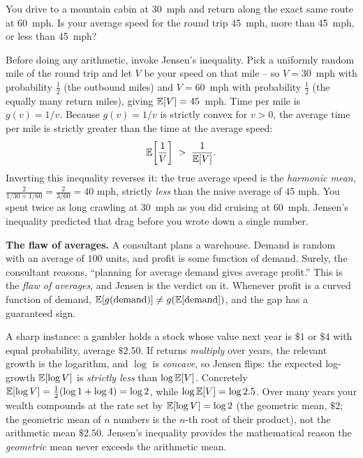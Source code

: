 \begin{walkbox}
You drive to a mountain cabin at 30~mph and return along the exact same route
at 60~mph. Is your average speed for the round trip 45~mph, more than 45~mph,
or less than 45~mph?

Before doing any arithmetic, invoke Jensen's inequality. Pick a uniformly random
mile of the round trip and let $V$ be your speed on that mile -- so $V = 30$~mph
with probability $\tfrac12$ (the outbound miles) and $V = 60$~mph with probability
$\tfrac12$ (the equally many return miles), giving $\operatorname{\mathbb{E}}[V] = 45$~mph. Time
per mile is $g(v) = 1/v$. Because $g(v) = 1/v$ is strictly convex for $v > 0$,
the average time per mile is strictly greater than the time at the average speed:
\[
  \operatorname{\mathbb{E}}\!\left[\frac{1}{V}\right] \;>\; \frac{1}{\operatorname{\mathbb{E}}[V]}.
\]
Inverting this inequality reverses it: the true average speed is the
\emph{harmonic mean},
$\frac{2}{1/30 + 1/60} = \frac{2}{3/60} = 40\text{ mph}$,
strictly \emph{less} than the naive average of $45\text{ mph}$. You spent
twice as long crawling at 30~mph as you did cruising at 60~mph. Jensen's
inequality predicted that drag before you wrote down a single number.
\end{walkbox}

\begin{paradoxbox}
\textbf{The flaw of averages.} A consultant plans a warehouse. Demand is
random with an average of $100$ units, and profit is some function of demand.
Surely, the consultant reasons, ``planning for average demand gives average
profit.'' This is the \emph{flaw of averages}, and Jensen is the verdict on
it. Whenever profit is a curved function of demand, $\operatorname{\mathbb{E}}[g(\text{demand})] \ne
g(\operatorname{\mathbb{E}}[\text{demand}])$, and the gap has a guaranteed sign.

A sharp instance: a gambler holds a stock whose value next year is $\$1$ or
$\$4$ with equal probability, average $\$2.50$. If returns \emph{multiply}
over years, the relevant growth is the logarithm, and $\log$ is
\emph{concave}, so Jensen flips: the expected log-growth $\operatorname{\mathbb{E}}[\log V]$ is
\emph{strictly less} than $\log \operatorname{\mathbb{E}}[V]$. Concretely $\operatorname{\mathbb{E}}[\log V] = \tfrac12(\log
1 + \log 4) = \log 2$, while $\log \operatorname{\mathbb{E}}[V] = \log 2.5$. Over many years your
wealth compounds at the rate set by $\operatorname{\mathbb{E}}[\log V] = \log 2$ (the geometric mean, $\$2$; the geometric mean of $n$
numbers is the $n$-th root of their product), not the arithmetic mean $\$2.50$. Jensen's inequality provides the
mathematical reason the \emph{geometric} mean never exceeds the arithmetic mean.
\end{paradoxbox}

